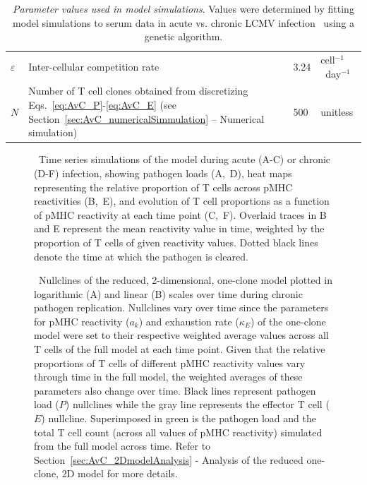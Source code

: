 \begin{table}[ht]
\begin{tabular}{p{} p{} p{} p{}}
    $\varepsilon$ & Inter-cellular competition rate & 3.24\E{-6} & cell$^{-1}$~day$^{-1}$ \\
    $N$ & Number of T cell clones obtained from discretizing Eqs.~\eqref{eq:AvC_P}-\eqref{eq:AvC_E} (see Section~\ref{sec:AvC_numericalSimmulation} -- Numerical simulation) & 500 & unitless \\
    \hline
\end{tabular}
\caption[Parameter values used in model simulations]{\textit{Parameter values used in model simulations}. Values were determined by fitting model simulations to serum data in acute vs. chronic LCMV infection~\cite{wherry2003viral} using a genetic algorithm.}
\label{tab:AvC_parameters}
\end{table}

\renewcommand{\thefigure}{S\thechapter.\arabic{figure}}
\setcounter{figure}{0}

\vspace{0.5in}
\begin{figure}[h]
    \centering
    \caption[]{~Time series simulations of the model during acute (A-C) or chronic (D-F) infection, showing pathogen loads (A,~D), heat maps representing the relative proportion of T cells across pMHC reactivities (B,~E), and evolution of T cell proportions as a function of pMHC reactivity at each time point (C,~F). Overlaid traces in B and E represent the mean reactivity value in time, weighted by the proportion of T cells of given reactivity values. Dotted black lines denote the time at which the pathogen is cleared.}
    \label{mov:AvC_timeSeries}
\end{figure}

\begin{figure}
    \centering
    \caption[]{~Nullclines of the reduced, 2-dimensional, one-clone model plotted in logarithmic (A) and linear (B) scales over time during chronic pathogen replication. Nullclines vary over time since the parameters for pMHC reactivity ($a_k$) and exhaustion rate ($\kappa_E$) of the one-clone model were set to their respective weighted average values across all T cells of the full model at each time point. Given that the relative proportions of T cells of different pMHC reactivity values vary through time in the full model, the weighted averages of these parameters also change over time. Black lines represent pathogen load ($P$) nullclines while the gray line represents the effector T cell ($E$) nullcline. Superimposed in green is the pathogen load and the total T cell count (across all values of pMHC reactivity) simulated from the full model across time. Refer to Section~\ref{sec:AvC_2DmodelAnalysis} - Analysis of the reduced one-clone, 2D model for more details.}
    \label{mov:AvC_nullclines}
\end{figure}

